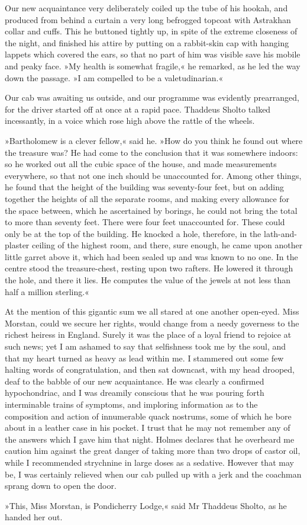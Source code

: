 Our new acquaintance very deliberately coiled up the tube of his hookah, and produced from behind a curtain a very long befrogged topcoat with Astrakhan collar and cuffs. This he buttoned tightly up, in spite of the extreme closeness of the night, and finished his attire by putting on a rabbit-skin cap with hanging lappets which covered the ears, so that no part of him was visible save his mobile and peaky face. »My health is somewhat fragile,« he remarked, as he led the way down the passage. »I am compelled to be a valetudinarian.«

Our cab was awaiting us outside, and our programme was evidently prearranged, for the driver started off at once at a rapid pace. Thaddeus Sholto talked incessantly, in a voice which rose high above the rattle of the wheels.

»Bartholomew is a clever fellow,« said he. »How do you think he found out where the treasure was? He had come to the conclusion that it was somewhere indoors: so he worked out all the cubic space of the house, and made measurements everywhere, so that not one inch should be unaccounted for. Among other things, he found that the height of the building was seventy-four feet, but on adding together the heights of all the separate rooms, and making every allowance for the space between, which he ascertained by borings, he could not bring the total to more than seventy feet. There were four feet unaccounted for. These could only be at the top of the building. He knocked a hole, therefore, in the lath-and-plaster ceiling of the highest room, and there, sure enough, he came upon another little garret above it, which had been sealed up and was known to no one. In the centre stood the treasure-chest, resting upon two rafters. He lowered it through the hole, and there it lies. He computes the value of the jewels at not less than half a million sterling.«

At the mention of this gigantic sum we all stared at one another open-eyed. Miss Morstan, could we secure her rights, would change from a needy governess to the richest heiress in England. Surely it was the place of a loyal friend to rejoice at such news; yet I am ashamed to say that selfishness took me by the soul, and that my heart turned as heavy as lead within me. I stammered out some few halting words of congratulation, and then sat downcast, with my head drooped, deaf to the babble of our new acquaintance. He was clearly a confirmed hypochondriac, and I was dreamily conscious that he was pouring forth interminable trains of symptoms, and imploring information as to the composition and action of innumerable quack nostrums, some of which he bore about in a leather case in his pocket. I trust that he may not remember any of the answers which I gave him that night. Holmes declares that he overheard me caution him against the great danger of taking more than two drops of castor oil, while I recommended strychnine in large doses as a sedative. However that may be, I was certainly relieved when our cab pulled up with a jerk and the coachman sprang down to open the door.

»This, Miss Morstan, is Pondicherry Lodge,« said Mr Thaddeus Sholto, as he handed her out.
